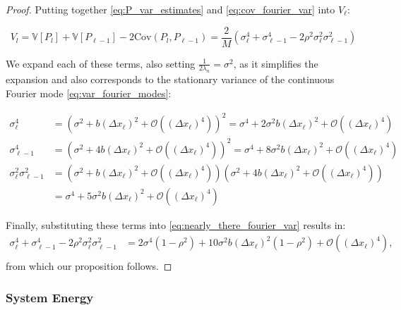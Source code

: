 \begin{proof}
    Putting together \eqref{eq:P_var_estimates} and 
    \eqref{eq:cov_fourier_var} into $V_\ell$:

    \begin{equation}\label{eq:nearly_there_fourier_var}
        V_l = \mathbb{V}[P_l] + \mathbb{V}[P_{\ell-1}] - 
        2\mathrm{Cov}(P_l, P_{\ell-1}) = 
        \frac{2}{M}(\sigma_\ell^4 + \sigma_{\ell-1}^4 -
        2\rho^2 \sigma_\ell^2 \sigma_{\ell-1}^2)
    \end{equation}

    We expand each of these terms, also setting 
    $\frac{1}{2\lambda_n} = \sigma^2$, as it simplifies the expansion and 
    also corresponds to the stationary variance of the
    continuous Fourier mode \eqref{eq:var_fourier_modes}:

    \begin{align*}
        \sigma_\ell^4 &= \left(\sigma^2 + b (\Delta x_\ell)^2 + 
        \mathcal{O}\left((\Delta x_\ell)^4\right)\right)^2 = 
        \sigma^4 + 
        2 \sigma^2 b (\Delta x_\ell)^2 + \mathcal{O}\left((\Delta x_\ell)^4\right)
        \\
        \sigma_{\ell-1}^4 &= \left(\sigma^2 + 4b (\Delta x_\ell)^2 + 
        \mathcal{O}\left((\Delta x_\ell)^4\right)\right)^2 =
        \sigma^4 + 8\sigma^2 b(\Delta x_\ell)^2 + 
        \mathcal{O}\left((\Delta x_\ell)^4\right)
        \\
        \sigma_\ell^2 \sigma_{\ell-1}^2 &= \left(\sigma^2+ b(\Delta x_\ell)^2 + 
        \mathcal{O}\left((\Delta x_\ell)^4\right)\right)(\sigma^2
        + 4b(\Delta x_\ell)^2 + \mathcal{O}\left((\Delta x_\ell)^4\right))\\
        &= \sigma^4 + 5\sigma^2b(\Delta x_\ell)^2 + 
        \mathcal{O}\left((\Delta x_\ell)^4\right)
    \end{align*}

    Finally, substituting these terms into \eqref{eq:nearly_there_fourier_var}
    results in:
    \begin{align*}
        \sigma_\ell^4 + \sigma_{\ell-1}^4 - 2\rho^2 \sigma_\ell^2 
        \sigma_{\ell-1}^2 &= 2 \sigma^4(1 - \rho^2) + 10 \sigma^2b 
        (\Delta x_\ell)^2(1 - \rho^2) + 
        \mathcal{O}\left((\Delta x_\ell)^4\right), \\
    \end{align*}
    from which our proposition follows.
\end{proof}


\subsubsection{System Energy}\label{sec:system_energy}

